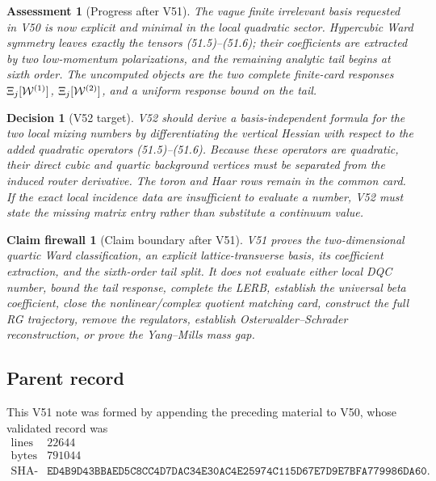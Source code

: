 \documentclass[11pt,oneside]{book}
\newtheorem{assessment}[theorem]{Assessment}
\newtheorem{firewall}[theorem]{Claim firewall}
\newtheorem{decision}[theorem]{Decision}
\theoremstyle{definition}
\theoremstyle{remark}
\begin{document}
\begin{assessment}[Progress after V51]
\label{ass:e8v51-status}
The vague finite irrelevant basis requested in V50 is now explicit
and minimal in the local quadratic sector.  Hypercubic Ward
symmetry leaves exactly the tensors (51.5)--(51.6); their
coefficients are extracted by two low-momentum polarizations, and
the remaining analytic tail begins at sixth order.  The uncomputed
objects are the two complete finite-card responses
\(\Xi_j[{\cal W}^{(1)}]\), \(\Xi_j[{\cal W}^{(2)}]\), and a
uniform response bound on the tail.
\end{assessment}

\begin{decision}[V52 target]
\label{dec:e8v51-next}
V52 should derive a basis-independent formula for the two local
mixing numbers by differentiating the vertical Hessian with respect
to the added quadratic operators (51.5)--(51.6).  Because these
operators are quadratic, their direct cubic and quartic background
vertices must be separated from the induced router derivative.
The toron and Haar rows remain in the common card.  If the exact
local incidence data are insufficient to evaluate a number, V52
must state the missing matrix entry rather than substitute a
continuum value.
\end{decision}

\begin{firewall}[Claim boundary after V51]
\label{fire:e8v51-claim}
V51 proves the two-dimensional quartic Ward classification, an
explicit lattice-transverse basis, its coefficient extraction, and
the sixth-order tail split.  It does not evaluate either local DQC
number, bound the tail response, complete the LERB, establish the
universal beta coefficient, close the nonlinear/complex quotient
matching card, construct the full RG trajectory, remove the
regulators, establish Osterwalder--Schrader reconstruction, or
prove the Yang--Mills mass gap.
\end{firewall}

\subsection{Parent record}

This V51 note was formed by appending the preceding material to V50,
whose validated record was
\[
\begin{array}{c|c}
\text{lines}&22644\\
\text{bytes}&791044\\
\text{SHA-256}&
\texttt{ED4B9D43BBAED5C8CC4D7DAC34E30AC4E25974C115D67E7D9E7BFA779986DA60}.
\end{array}
\]
\end{document}
